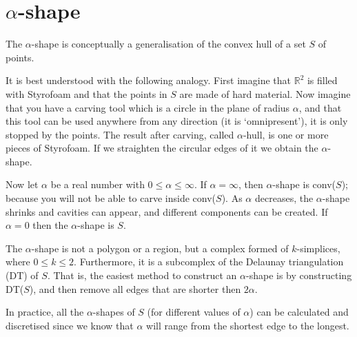 %
\section{$\alpha$-shape}

The $\alpha$-shape is conceptually a generalisation of the convex hull of a set $S$ of points.

%

It is best understood with the following analogy.
First imagine that $\mathbb{R}^2$ is filled with Styrofoam and that the points in $S$ are made of hard material.
Now imagine that you have a carving tool which is a circle in the plane of radius $\alpha$, and that this tool can be used anywhere from any direction (it is `omnipresent'), it is only stopped by the points.
The result after carving, called $\alpha$-hull, is one or more pieces of Styrofoam.
If we straighten the circular edges of it we obtain the $\alpha$-shape.

%

Now let $\alpha$ be a real number with $0 \leq \alpha \leq \infty$.
If $\alpha = \infty$, then $\alpha$-shape is conv($S$); because you will not be able to carve inside conv($S$).
As $\alpha$ decreases, the $\alpha$-shape shrinks and cavities can appear, and different components can be created.
If $\alpha = 0$ then the $\alpha$-shape is $S$.

%

The $\alpha$-shape is not a polygon or a region, but a complex formed of $k$-simplices, where $0 \leq k \leq 2$.
Furthermore, it is a subcomplex of the Delaunay triangulation (DT) of $S$.
That is, the easiest method to construct an $\alpha$-shape is by constructing DT($S$), and then remove all edges that are shorter then $2\alpha$.

In practice, all the $\alpha$-shapes of $S$ (for different values of $\alpha$) can be calculated and discretised since we know that $\alpha$ will range from the shortest edge to the longest.

